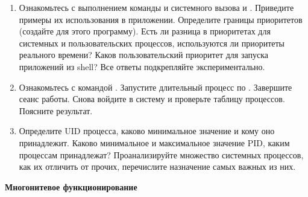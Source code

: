 \begin{enumerate}
	\item Ознакомьтесь с выполнением команды и системного вызова  и . Приведите примеры их использования в приложении. Определите границы приоритетов (создайте для этого программу). Есть ли разница в приоритетах для системных и пользовательских процессов, используются ли приоритеты реального времени? Каков пользовательский приоритет для запуска приложений из shell? Все ответы подкрепляйте экспериментально.
	\item Ознакомьтесь с командой . Запустите длительный процесс по . Завершите сеанс работы. Снова войдите в систему и проверьте таблицу процессов. Поясните результат.
	\item Определите UID процесса, каково минимальное значение и кому оно принадлежит. Каково минимальное и максимальное значение PID, каким процессам принадлежат? Проанализируйте множество системных процессов, как их отличить от прочих, перечислите назначение самых важных из них.
\end{enumerate}

\textbf{Многонитевое функционирование}

